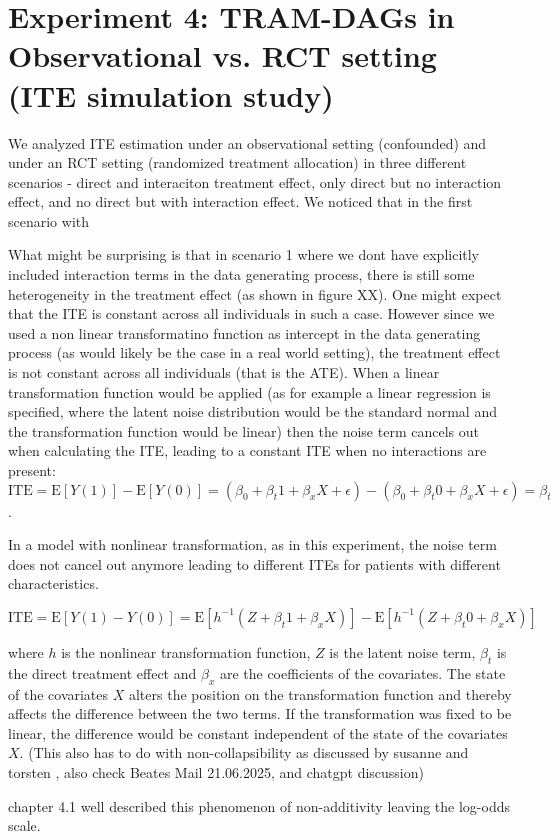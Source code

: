 \section{Experiment 4: TRAM-DAGs in Observational vs. RCT setting  (ITE simulation study)}

We analyzed ITE estimation under an observational setting (confounded) and under an RCT setting (randomized treatment allocation) in three different scenarios - direct and interaciton treatment effect, only direct but no interaction effect, and no direct but with interaction effect. We noticed that in the first scenario with 


What might be surprising is that in scenario 1 where we dont have explicitly included interaction terms in the data generating process, there is still some heterogeneity in the treatment effect (as shown in figure XX). One might expect that the ITE is constant across all individuals in such a case. However since we used a non linear transformatino function as intercept in the data generating process (as would likely be the case in a real world setting), the treatment effect is not constant across all individuals (that is the ATE). When a linear transformation function would be applied (as for example a linear regression is specified, where the latent noise distribution would be the standard normal and the transformation function would be linear) then the noise term cancels out when calculating the ITE, leading to a constant ITE when no interactions are present: $\text{ITE} = \text{E}[Y(1)] -\text{E}[Y(0)] = (\beta_0 + \beta_t 1 + \beta_x X + \epsilon) - (\beta_0 + \beta_t 0 + \beta_x X + \epsilon) = \beta_t$.

In a model with nonlinear transformation, as in this experiment, the noise term does not cancel out anymore leading to different ITEs for patients with different characteristics.

\begin{equation}
\text{ITE} = \text{E}[Y(1) - Y(0)] = \text{E}[h^{-1}(Z + \beta_t 1 + \beta_x X)] - \text{E}[h^{-1}(Z + \beta_t 0 + \beta_x X)] 
\end{equation}

where $h$ is the nonlinear transformation function, $Z$ is the latent noise term, $\beta_t$ is the direct treatment effect and $\beta_x$ are the coefficients of the covariates. The state of the covariates $X$ alters the position on the transformation function and thereby affects the difference between the two terms. If the transformation was fixed to be linear, the difference would be constant independent of the state of the covariates $X$. (This also has to do with non-collapsibility as discussed by susanne and torsten , also check Beates Mail 21.06.2025, and chatgpt discussion)

\citep{hoogland2021} chapter 4.1 well described this phenomenon of non-additivity leaving the log-odds scale.





